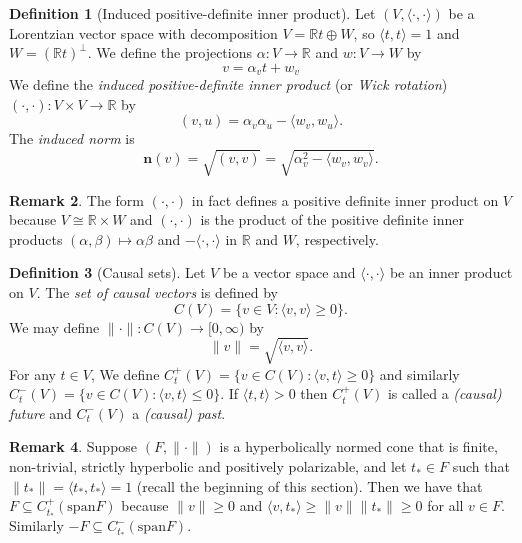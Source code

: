 \documentclass[a4paper,11pt]{article}
\numberwithin{equation}{section}
\theoremstyle{definition}
\newtheorem{Definition}{Definition}[section]
\newtheorem{Remark}[Definition]{Remark}
\theoremstyle{plain}
\newcommand{\R}{\mathbb R}
\newcommand{\spn}{\mathrm{span}}
\newcommand{\inner}[2]{\langle #1, #2 \rangle}
\newcommand{\norm}[1]{\| #1\|}
\begin{document}
\begin{Definition}[Induced positive-definite inner product]
Let $(V, \inner{\cdot}{\cdot})$ be a Lorentzian vector space with decomposition $V = \R t \oplus W$, so $\inner{t}{t} = 1$ and $W = (\R t)^\perp$. We define the projections $\alpha: V \longrightarrow \R$ and $w: V \longrightarrow W$ by 
$$v = \alpha_{v}t + w_{v}$$
We define the \textit{induced positive-definite inner product} (or \textit{Wick rotation}) $(\cdot, \cdot): V \times V \longrightarrow \R$ by
\begin{equation}
(v, u) = \alpha_{v}\alpha_{u} - \inner{w_{v}}{w_{u}}.
\end{equation}
The \textit{induced norm} is 
\begin{equation}
\textbf{n}(v) = \sqrt{(v, v)} = \sqrt{\alpha_{v}^{2} - \inner{w_{v}}{w_{v}}}.
\end{equation}
\end{Definition}

\begin{Remark}
     The form $(\cdot, \cdot)$ in fact defines a positive definite inner product on $V$ because $V \cong \R \times W$ and $(\cdot, \cdot)$ is the product of the positive definite inner products $(\alpha, \beta) \mapsto \alpha \beta$ and $-\inner{\cdot}{\cdot}$ in $\R$ and $W$, respectively. 
\end{Remark}


\begin{Definition}[Causal sets]
    Let $V$ be a vector space and $\inner{\cdot}{\cdot}$ be an inner product on $V$. The \textit{set of causal vectors} is defined by
    $$C(V) = \{v \in V: \inner{v}{v} \geq 0\}.$$
    We may define $\norm{\cdot}: C(V) \longrightarrow [0, \infty)$ by $$\norm{v} = \sqrt{\inner{v}{v}}.$$
    For any $t \in V$, We define $C_{t}^{+}(V) = \{v \in C(V): \inner{v}{t} \geq 0\}$ and similarly $C_{t}^{-}(V) = \{v \in C(V): \inner{v}{t} \leq 0\}$. If $\inner{t}{t} > 0$ then $C_{t}^{+}(V)$ is called a \textit{(causal) future} and $C_t^-(V)$ a \textit{(causal) past}. 
\end{Definition}

\begin{Remark}
    Suppose $(F,\norm{\cdot})$ is a hyperbolically normed cone that is finite, non-trivial, strictly hyperbolic and positively polarizable, and let $t_* \in F$ such that $\norm{t_*} = \inner{t_*}{t_*} = 1$ (recall the beginning of this section). Then we have that $F \subseteq C_{t_{*}}^{+}(\spn F)$ because $\norm{v} \geq 0$ and $\inner{v}{t_{*}} \geq \norm{v}\norm{t_{*}} \geq 0$ for all $v \in F$. Similarly $-F \subseteq C_{t_{*}}^{-}(\spn F)$.
\end{Remark}
\end{document}
